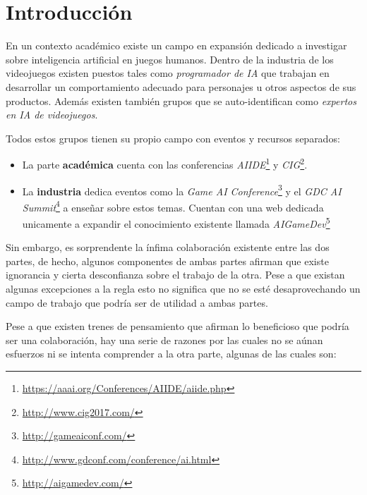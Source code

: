 \chapter{Introducción}

En un contexto académico existe un campo en expansión dedicado a investigar sobre inteligencia artificial en juegos humanos. Dentro de la industria de los videojuegos existen puestos tales como \textit{programador de IA} que trabajan en desarrollar un comportamiento adecuado para personajes u otros aspectos de sus productos. Además existen también grupos que se auto-identifican como \textit{expertos en IA de videojuegos}.

\bigskip

Todos estos grupos tienen su propio campo con eventos y recursos separados:

\begin{itemize}
	\item La parte \textbf{académica} cuenta con las conferencias \textit{AIIDE}\footnote{\url{https://aaai.org/Conferences/AIIDE/aiide.php}} y \textit{CIG}\footnote{\url{http://www.cig2017.com/}}.
	\item La \textbf{industria} dedica eventos como la \textit{Game AI Conference}\footnote{\url{http://gameaiconf.com/}} y el \textit{GDC AI Summit}\footnote{\url{http://www.gdconf.com/conference/ai.html}} a enseñar sobre estos temas. Cuentan con una web dedicada unicamente a expandir el conocimiento existente llamada \textit{AIGameDev}\footnote{\url{http://aigamedev.com/}}
\end{itemize}

\bigskip

Sin embargo, es sorprendente la ínfima colaboración existente entre las dos partes, de hecho, algunos componentes de ambas partes afirman que existe ignorancia y cierta desconfianza sobre el trabajo de la otra. Pese a que existan algunas excepciones a la regla esto no significa que no se esté desaprovechando un campo de trabajo que podría ser de utilidad a ambas partes\cite{blog:emerging}.

\bigskip

Pese a que existen trenes de pensamiento que afirman lo beneficioso que podría ser una colaboración\cite{cio}, hay una serie de razones por las cuales no se aúnan esfuerzos ni se intenta comprender a la otra parte, algunas de las cuales son:

